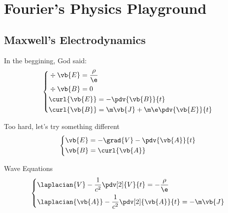 \section{Fourier's Physics Playground}

    \subsection{Maxwell's Electrodynamics}
    \frame{\sectionpage}

    \begin{frame}{In the beggining, God said:}
        \begin{equation*}
            \left\lbrace
            \begin{aligned}
                &\div{\vb{E}} = \frac{\rho}{\e}\\
                &\div{\vb{B}} = 0\\
                &\curl{\vb{E}} = - \pdv{\vb{B}}{t}\\
                &\curl{\vb{B}} = \m\vb{J}
 + \m\e\pdv{\vb{E}}{t}                        
            \end{aligned}
            \right.
        \end{equation*}
        
    \end{frame}
    
    \begin{frame}{Too hard, let's try something different}
        \begin{equation*}
            \left\lbrace
            \begin{aligned}
                &\vb{E} = - \grad{V} - \pdv{\vb{A}}{t} \\
                &\vb{B} = \curl{\vb{A}}
            \end{aligned}
            \right.
        \end{equation*}
    \end{frame}
    
    \begin{frame}{Wave Equations}
        \begin{equation*}
            \left\lbrace
            \begin{aligned}
                &\laplacian{V} - \frac{1}{c^2}\pdv[2]{V}{t} = - \frac{\rho}{\e}\\
                &\laplacian{\vb{A}} - \frac{1}{c^2}\pdv[2]{\vb{A}}{t} = - \m\vb{J}
            \end{aligned}
            \right.
        \end{equation*}
    \end{frame}
    
